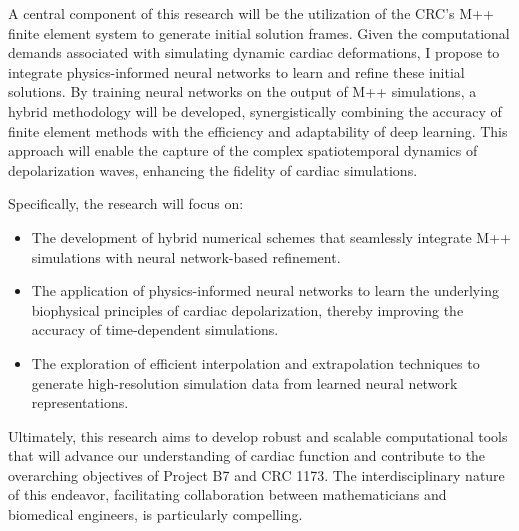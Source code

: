 	A central component of this research will be the utilization of the CRC's M++ finite element system to generate initial solution frames. Given the computational demands associated with simulating dynamic cardiac deformations, I propose to integrate physics-informed neural networks to learn and refine these initial solutions. By training neural networks on the output of M++ simulations, a hybrid methodology will be developed, synergistically combining the accuracy of finite element methods with the efficiency and adaptability of deep learning. This approach will enable the capture of the complex spatiotemporal dynamics of depolarization waves, enhancing the fidelity of cardiac simulations.
	
	Specifically, the research will focus on:
	\begin{itemize}
		\item The development of hybrid numerical schemes that seamlessly integrate M++ simulations with neural network-based refinement.
		\item The application of physics-informed neural networks to learn the underlying biophysical principles of cardiac depolarization, thereby improving the accuracy of time-dependent simulations.
		\item The exploration of efficient interpolation and extrapolation techniques to generate high-resolution simulation data from learned neural network representations.
	\end{itemize}
	
	Ultimately, this research aims to develop robust and scalable computational tools that will advance our understanding of cardiac function and contribute to the overarching objectives of Project B7 and CRC 1173. The interdisciplinary nature of this endeavor, facilitating collaboration between mathematicians and biomedical engineers, is particularly compelling.